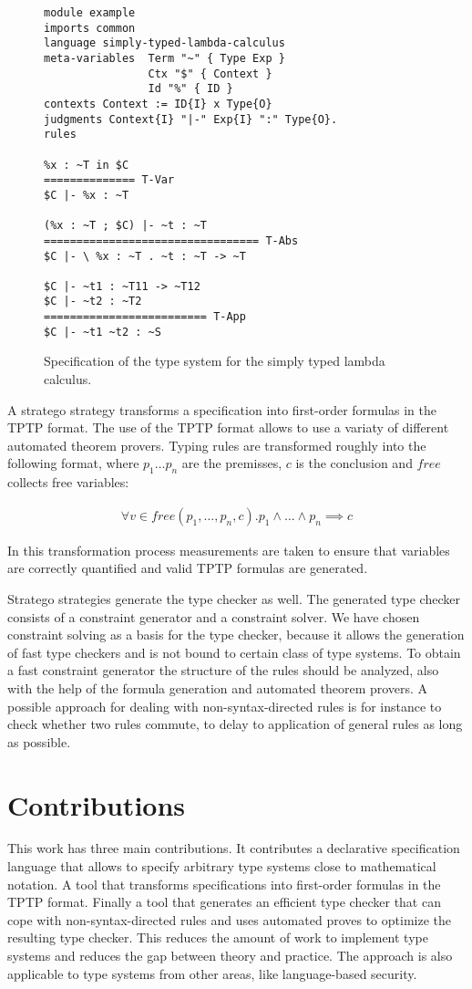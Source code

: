 \documentclass{acm_proc_article-sp}
\begin{document}
\begin{figure}
\begin{verbatim}
module example
imports common
language simply-typed-lambda-calculus
meta-variables 	Term "~" { Type Exp }
                Ctx "$" { Context }
                Id "%" { ID }
contexts Context := ID{I} x Type{O}
judgments Context{I} "|-" Exp{I} ":" Type{O}.
rules

%x : ~T in $C
============== T-Var
$C |- %x : ~T

(%x : ~T ; $C) |- ~t : ~T
================================= T-Abs
$C |- \ %x : ~T . ~t : ~T -> ~T

$C |- ~t1 : ~T11 -> ~T12
$C |- ~t2 : ~T2
========================= T-App
$C |- ~t1 ~t2 : ~S
\end{verbatim}
\caption{Specification of the type system for the simply typed lambda
  calculus.}
\label{fig:example-specification}
\end{figure}

A stratego strategy transforms a specification into first-order
formulas in the TPTP \cite{Sutcliffe04tstpdata-exchange} format. The
use of the TPTP format allows to use a variaty of different automated
theorem provers. Typing rules are transformed roughly into the
following format, where $p_1 \dots p_n$ are the premisses, $c$ is the
conclusion and $free$ collects free variables:

\begin{align}
  \forall v \in free(p_1, \dots, p_n, c) . p_1 \land \dots \land p_n \implies  c 
\end{align}

In this transformation process measurements are taken to ensure that
variables are correctly quantified and valid TPTP formulas are
generated.

Stratego strategies generate the type checker as well. The generated
type checker consists of a constraint generator and a constraint
solver. We have chosen constraint solving as a basis for the type
checker, because it allows the generation of fast type checkers and is
not bound to certain class of type systems. To obtain a fast
constraint generator the structure of the rules should be analyzed,
also with the help of the formula generation and automated theorem
provers. A possible approach for dealing with non-syntax-directed
rules is for instance to check whether two rules commute, to delay to
application of general rules as long as possible.
\section{Contributions}
This work has three main contributions. It contributes a declarative
specification language that allows to specify arbitrary type systems
close to mathematical notation. A tool that transforms specifications
into first-order formulas in the TPTP format. Finally a tool that
generates an efficient type checker that can cope with
non-syntax-directed rules and uses automated proves to optimize the
resulting type checker. This reduces the amount of work to implement
type systems and reduces the gap between theory and practice. The
approach is also applicable to type systems from other areas, like
language-based security.
\end{document}
